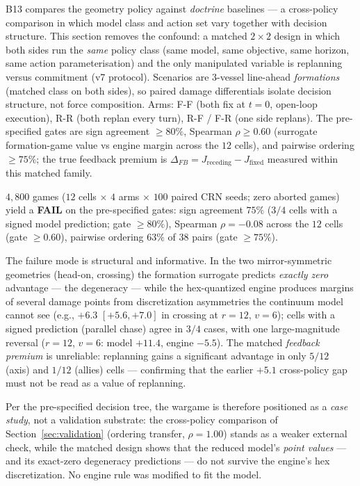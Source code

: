 \documentclass[12pt,a4paper]{article}
\begin{document}
B13 compares the geometry policy against \emph{doctrine} baselines --- a
cross-policy comparison in which model class and action set vary together
with decision structure.  This section removes the confound: a matched
$2\times2$ design in which both sides run the \emph{same} policy class
(same model, same objective, same horizon, same action parameterisation)
and the only manipulated variable is replanning versus commitment
(v7 protocol).  Scenarios are $3$-vessel line-ahead \emph{formations}
(matched class on both sides), so paired damage differentials isolate
decision structure, not force composition.  Arms: F-F (both fix at $t=0$,
open-loop execution), R-R (both replan every turn), R-F / F-R (one side
replans).  The pre-specified gates are sign agreement $\ge80\%$, Spearman
$\rho\ge0.60$ (surrogate formation-game value vs engine margin across the
$12$ cells), and pairwise ordering $\ge75\%$; the true feedback premium is
$\Delta_{FB}=J_{\text{receding}}-J_{\text{fixed}}$ measured within this
matched family.

$4{,}800$ games ($12$ cells $\times$ $4$ arms $\times$ $100$ paired CRN
seeds; zero aborted games) yield a \textbf{FAIL} on the pre-specified
gates: sign agreement $75\%$ ($3/4$ cells with a signed model prediction;
gate $\ge80\%$), Spearman $\rho=-0.08$ across the $12$ cells (gate
$\ge0.60$), pairwise ordering $63\%$ of $38$ pairs (gate $\ge75\%$).

The failure mode is structural and informative.  In the two
mirror-symmetric geometries (head-on, crossing) the formation surrogate
predicts \emph{exactly zero} advantage --- the degeneracy --- while the
hex-quantized engine produces margins of several damage points from
discretization asymmetries the continuum model cannot see
(e.g., $+6.3$ $[+5.6,+7.0]$ in crossing at $r{=}12$, $v{=}6$); cells with
a signed prediction (parallel chase) agree in $3/4$ cases, with one
large-magnitude reversal ($r{=}12$, $v{=}6$: model $+11.4$, engine
$-5.5$).  The matched \emph{feedback premium} is unreliable: replanning
gains a significant advantage in only $5/12$ (axis) and $1/12$ (allies)
cells --- confirming that the earlier $+5.1$ cross-policy gap must not be
read as a value of replanning.

Per the pre-specified decision tree, the wargame is therefore positioned
as a \emph{case study}, not a validation substrate: the cross-policy
comparison of Section~\ref{sec:validation} (ordering transfer,
$\rho=1.00$) stands as a weaker external check, while the matched design
shows that the reduced model's \emph{point values} --- and its
exact-zero degeneracy predictions --- do not survive the engine's hex
discretization.  No engine rule was modified to fit the model.
\end{document}
